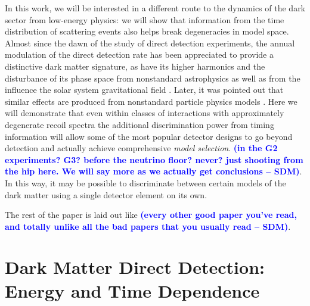 \documentclass[11pt]{article}
\newcommand{\sdm}[1]{\textcolor{blue}{\textbf{(#1 -- SDM)}}}
\begin{document}
In this work, we will be interested in a different route to the dynamics of the dark sector from low-energy physics: we will show that information from the time distribution of scattering events also helps break degeneracies in model space. Almost since the dawn of the study of direct detection experiments, the annual modulation of the direct detection rate \cite{Freese:1987wu} has been appreciated to provide a distinctive dark matter signature, as have its higher harmonics \cite{Freese:2012xd,Lee:2013xxa} and the disturbance of its phase space from nonstandard astrophysics \cite{Green:2000ga,Gelmini:2000dm} as well as from the influence the solar system gravitational field \cite{Lee:2013wza,DelNobile:2015tza,DelNobile:2015nua,DelNobile:2015rmp}. Later, it was pointed out that similar effects are produced from nonstandard particle physics models \cite{DelNobile:2015tza}. Here we will demonstrate that even within classes of interactions with approximately degenerate recoil spectra the additional discrimination power from timing information will allow some of the most popular detector designs to go beyond detection and actually achieve comprehensive {\it model selection}. \sdm{in the G2 experiments? G3? before the neutrino floor? never? just shooting from the hip here. We will say more as we actually get conclusions}. In this way, it may be possible to discriminate between certain models of the dark matter using a single detector element on its own.

The rest of the paper is laid out like \sdm{every other good paper you've read, and totally unlike all the bad papers that you usually read}.

\section{Dark Matter Direct Detection: Energy and Time Dependence}
\end{document}
